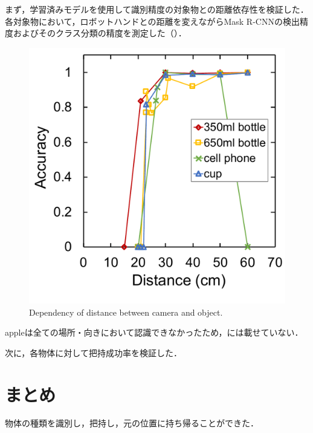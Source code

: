 まず，学習済みモデルを使用して識別精度の対象物との距離依存性を検証した．各対象物において，ロボットハンドとの距離を変えながらMask R-CNNの検出精度およびそのクラス分類の精度を測定した（）．
\begin{figure}[H]
    \centering
    \includegraphics[width=0.6\linewidth]{figure/chapter4/mrcnn_depth}
    \caption{Dependency of distance between camera and object.}
    \label{fig:mrcnn距離}
\end{figure}
appleは全ての場所・向きにおいて認識できなかったため，には載せていない．



次に，各物体に対して把持成功率を検証した．



\section{まとめ}
物体の種類を識別し，把持し，元の位置に持ち帰ることができた．



